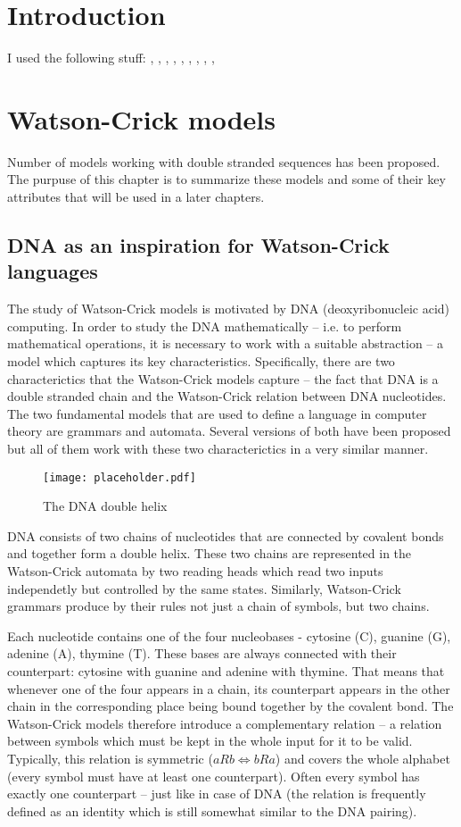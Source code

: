 \chapter{Introduction}

I used the following stuff: \cite{A1}, \cite{DETERM_WKA}, \cite{A3}, \cite{A4}, \cite{A5}, \cite{A6}, \cite{A7}, \cite{WK_CYK}, \cite{WK_PUSHDOWN_AUT}, \cite{WK_FIN_AUT}


\chapter{Watson-Crick models}
Number of models working with double stranded sequences has been proposed. The purpuse of this chapter is to summarize these models and some of their key attributes that will be used in a later chapters.

\section{DNA as an inspiration for Watson-Crick languages}
The study of Watson-Crick models is motivated by DNA (deoxyribonucleic acid) computing. In order to study the DNA mathematically -- i.e. to perform mathematical operations, it is necessary to work with a suitable abstraction -- a model which captures its key characteristics. Specifically, there are two characterictics that the Watson-Crick models capture -- the fact that DNA is a double stranded chain and the Watson-Crick relation between DNA nucleotides.
The two fundamental models that are used to define a language in computer theory are grammars and automata. Several versions of both have been proposed but all of them work with these two characterictics in a very similar manner.

\begin{figure}
  \texttt{[image: placeholder.pdf]}
  \centering
  \caption{The DNA double helix}
\end{figure}

DNA consists of two chains of nucleotides that are connected by covalent bonds and together form a double helix. These two chains are represented in the Watson-Crick automata by two reading heads which read two inputs independetly but controlled by the same states. Similarly, Watson-Crick grammars produce by their rules not just a chain of symbols, but two chains.

Each nucleotide contains one of the four nucleobases - cytosine (C), guanine (G), adenine (A), thymine (T). These bases are always connected with their counterpart: cytosine with guanine and adenine with thymine. That means that whenever one of the four appears in a chain, its counterpart appears in the other chain in the corresponding place being bound together by the covalent bond. The Watson-Crick models therefore introduce a complementary relation -- a relation between symbols which must be kept in the whole input for it to be valid. Typically, this relation is symmetric ($a R b \Leftrightarrow b R a$) and covers the whole alphabet (every symbol must have at least one counterpart). Often every symbol has exactly one counterpart -- just like in case of DNA (the relation is frequently defined as an identity which is still somewhat similar to the DNA pairing).


